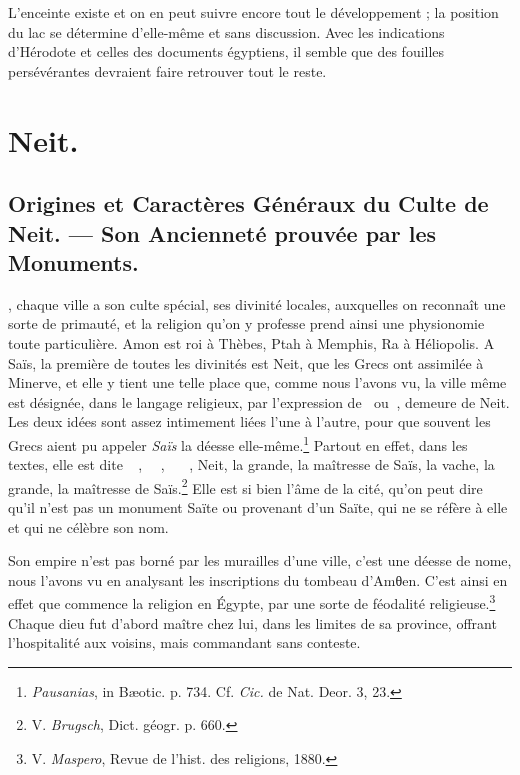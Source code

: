 \documentclass[letterpaper,twocolumn,openany,nodeprecatedcode]{dndbook}
\newcommand*\hieroAAAC{}
\newcommand*\hieroAAAG{}
\newcommand*\hieroAAAI{}
\newcommand*\hieroAAAO{}
\newcommand*\hieroAAAW{\raisebox{0.5ex}{}}
\newcommand*\hieroAABC{\raisebox{0.5ex}{}}
\newcommand*\hieroAACS{}
\newcommand*\hieroAAHK{}
\newcommand*\hieroAAHN{}
\newcommand*\hieroAALQ{}
\newcommand*\hieroAALR{\raisebox{0.3ex}{}}
\newcommand*\hieroAALS{}
\newcommand*\hieroAALT{}
\newcommand*\hieroAALU{\raisebox{0.5ex}{}}
\newcommand*\hieroAALV{}
\newcommand*\hieroAALW{}
\begin{document}
L'enceinte existe et on en peut suivre encore tout le développement ; la position du lac se détermine d'elle-même et sans discussion. Avec les indications d'Hérodote et celles des documents égyptiens, il semble que des fouilles persévérantes devraient faire retrouver tout le reste.
\clearpage
\part{Neit.}
\chapter{Origines et Caractères Généraux du Culte de Neit. --- Son Ancienneté prouvée par les Monuments.}
, chaque ville a son culte spécial, ses divinité locales, auxquelles on reconnaît une sorte de primauté, et la religion qu'on y professe prend ainsi une physionomie toute particulière. Amon est roi à Thèbes, Ptah à Memphis, Ra à Héliopolis. A Saïs, la première de toutes les divinités est Neit, que les Grecs ont assimilée à Minerve, et elle y tient une telle place que, comme nous l'avons vu, la ville même est désignée, dans le langage religieux, par l'expression de $\hieroAALQ\:\hieroAAHK$ ou $\hieroAAHN\:\hieroAAAO$, demeure de Neit. Les deux idées sont assez intimement liées l'une à l'autre, pour que souvent les Grecs aient pu appeler \emph{Saïs} la déesse elle-même.\footnote{\emph{Pausanias}, in Bæotic. p. 734. Cf. \emph{Cic.} de Nat. Deor. 3, 23.} Partout en effet, dans les textes, elle est dite $\hieroAALQ\:\hieroAABC\allowbreak\:\hieroAAAI\:\hieroAAAW$, $\hieroAALR\:\hieroAALS\:\hieroAABC\allowbreak\:\hieroAAAI\:\hieroAALT$, $\hieroAAAG\:\hieroAALU\:\hieroAALV\allowbreak\:\hieroAALW\:\hieroAABC\allowbreak\:\hieroAACS\:\hieroAAAC$, Neit, la grande, la maîtresse de Saïs, la vache, la grande, la maîtresse de Saïs.\footnote{V. \emph{Brugsch}, Dict. géogr. p. 660.} Elle est si bien l'âme de la cité, qu'on peut dire qu'il n'est pas un monument Saïte ou provenant d'un Saïte, qui ne se réfère à elle et qui ne célèbre son nom.

Son empire n'est pas borné par les murailles d'une ville, c'est une déesse de nome, nous l'avons vu en analysant les inscriptions du tombeau d'Amθen. C'est ainsi en effet que commence la religion en Égypte, par une sorte de féodalité religieuse.\footnote{V. \emph{Maspero}, Revue de l'hist. des religions, 1880.} Chaque dieu fut d'abord maître chez lui, dans les limites de sa province, offrant l'hospitalité aux voisins, mais commandant sans conteste.
\end{document}
